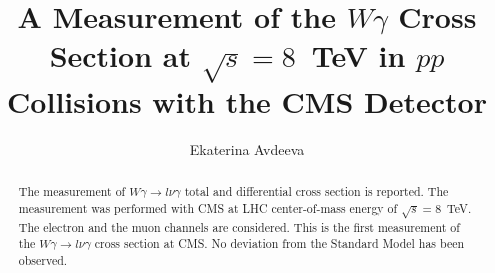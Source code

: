 \documentclass[print]{nuthesis}
\begin{document}
\frontmatter
\title{A Measurement of the $W\gamma$ Cross Section at $\sqrt{s}=8$~TeV in $pp$ Collisions with the CMS Detector}
\author{Ekaterina Avdeeva}
\maketitle
\begin{abstract}
The measurement of $W\gamma\rightarrow l\nu\gamma$ total and differential cross section is reported. The measurement was performed with CMS at LHC center-of-mass energy of $\sqrt{s}=8$~TeV. The electron and the muon channels are considered. This is the first measurement of the $W\gamma\rightarrow l\nu\gamma$ cross section at CMS. No deviation from the Standard Model has been observed.
% 
\end{abstract}





\end{document}
